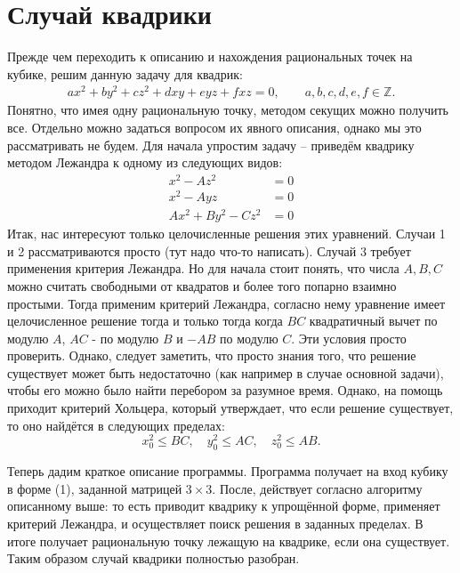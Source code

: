 \section*{Случай квадрики}
Прежде чем переходить к описанию и нахождения рациональных точек на кубике,
решим данную задачу для квадрик:
\begin{align}
    a x^2 + b y^2 + c z^2 + d x y + e y z + f x z = 0,  \qquad a, b, c, d, e, f \in
    \mathbb{Z} 
.\end{align}
Понятно, что имея одну рациональную точку, методом секущих можно получить
все. Отдельно можно задаться вопросом их явного описания, однако мы это
рассматривать не будем. Для начала упростим задачу -- приведём квадрику
методом Лежандра к одному из следующих видов:
\begin{align*}
    x^2 - A z^2 &= 0 \\
    x^2 - A y z &= 0 \\
    A x^2 + B y^2 - C z^2 &= 0 
\end{align*}
Итак, нас интересуют только целочисленные решения этих уравнений. Случаи 1 и 2
рассматриваются просто (тут надо что-то написать). Случай 3 требует применения
критерия Лежандра. Но для начала стоит понять, что числа $ A, B, C$ можно
считать свободными от квадратов и более того попарно взаимно простыми. Тогда
применим критерий Лежандра, согласно нему уравнение имеет целочисленное
решение тогда и только тогда когда \(BC\) квадратичный вычет по модулю \(A\),
\(AC\) - по модулю \(B\) и \(-AB\)  по модулю \(C\). Эти условия просто
проверить. Однако, следует заметить, что просто знания того, что решение
существует может быть недостаточно (как например в случае основной задачи),
чтобы его можно было найти перебором за разумное время. Однако, на помощь
приходит критерий Хольцера, который утверждает, что если решение существует,
то оно найдётся в следующих пределах:
\[
x_0^2 \leqslant BC, \quad y_0^2 \leqslant AC, \quad z_0^2 \leqslant AB
.\] 

Теперь дадим краткое описание программы.  Программа получает на вход кубику в
форме (1), заданной матрицей \(3 \times 3\). После, действует согласно алгоритму
описанному выше: то есть приводит квадрику к упрощённой форме, применяет
критерий Лежандра, и осуществляет поиск решения в заданных пределах. В итоге
получает рациональную точку лежащую на квадрике, если она существует. Таким
образом случай квадрики полностью разобран.

\bigskip

